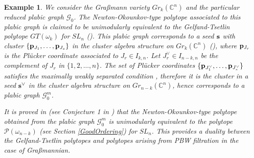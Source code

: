 \documentclass{emsprocart}
\newtheorem{example}[theorem]{Example}
\theoremstyle{definition}
\begin{document}
\begin{example}\label{FFLVpolytope}\rm
We consider the Gra\ss mann variety $Gr_{k}(\mathbb C^n)$ and the particular reduced plabic graph $\mathcal G_0$. The Newton-Okounkov-type polytope associated to this plabic graph is claimed to be unimodularly equivalent to the Gelfand-Tsetlin polytope $GT(\omega_k)$ for $SL_n$ (\cite{RW}). This plabic graph corresponds to a seed $\bold{s}$ with cluster $\{\bold{p}_{J_1},\ldots,\bold{p}_{J_s}\}$ in the cluster algebra structure on $Gr_k(\mathbb{C}^n)$ (\cite{Sc}), where $\bold{p}_{J_r}$ is the Pl\"ucker coordinate associated to $J_r\in I_{k,n}$. Let $J_r^\vee\in I_{n-k,n}$ be the complement of $J_r$ in $\{1,2,\ldots,n\}$. The set of Pl\"ucker coordinates $\{\bold{p}_{J_1^\vee},\ldots,\bold{p}_{J_s^\vee}\}$ satisfies the maximally weakly separated condition \cite{OPS}, therefore it is the cluster in a seed $\bold{s}^\vee$ in the cluster algebra structure on $Gr_{n-k}(\mathbb{C}^n)$, hence corresponds to a plabic graph $\mathcal G_0^m$.
\par
It is proved in \cite{FF} (see Conjecture 1 in \cite{Fang}) that the Newton-Okounkov-type polytope obtained from the plabic graph $\mathcal{G}_0^m$ is unimodularly equivalent to the polytope $\mathcal{P}(\omega_{n-k})$ (see Section \ref{GoodOrdering}) for $SL_n$. This provides a duality between the Gelfand-Tsetlin polytopes and polytopes arising from PBW filtration in the case of Gra\ss mannian. 
\end{example}
\end{document}
